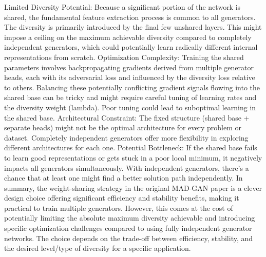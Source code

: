 Limited Diversity Potential: Because a significant portion of the network is shared, the fundamental feature extraction process is common to all generators. The diversity is primarily introduced by the final few unshared layers. This might impose a ceiling on the maximum achievable diversity compared to completely independent generators, which could potentially learn radically different internal representations from scratch.
Optimization Complexity: Training the shared parameters involves backpropagating gradients derived from multiple generator heads, each with its adversarial loss and influenced by the diversity loss relative to others. Balancing these potentially conflicting gradient signals flowing into the shared base can be tricky and might require careful tuning of learning rates and the diversity weight (lambda). Poor tuning could lead to suboptimal learning in the shared base.
Architectural Constraint: The fixed structure (shared base + separate heads) might not be the optimal architecture for every problem or dataset. Completely independent generators offer more flexibility in exploring different architectures for each one.
Potential Bottleneck: If the shared base fails to learn good representations or gets stuck in a poor local minimum, it negatively impacts all generators simultaneously. With independent generators, there's a chance that at least one might find a better solution path independently.
In summary, the weight-sharing strategy in the original MAD-GAN paper is a clever design choice offering significant efficiency and stability benefits, making it practical to train multiple generators. However, this comes at the cost of potentially limiting the absolute maximum diversity achievable and introducing specific optimization challenges compared to using fully independent generator networks. The choice depends on the trade-off between efficiency, stability, and the desired level/type of diversity for a specific application.
